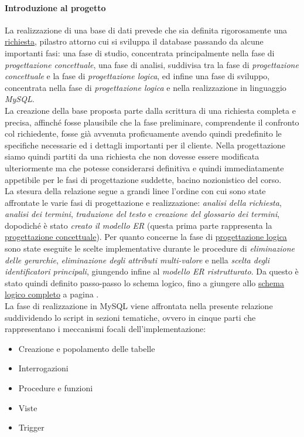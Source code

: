 \documentclass[11pt, openany]{article}
\theoremstyle{definition}
\theoremstyle{plain}
\theoremstyle{remark}
\begin{document}
		\paragraph{Introduzione al progetto}
			La realizzazione di una base di dati prevede che sia definita rigorosamente una \underline{richiesta}, pilastro attorno cui si sviluppa il database passando da alcune importanti fasi: una fase di studio, concentrata principalmente nella fase di \textit{progettazione concettuale}, una fase di analisi, suddivisa tra la fase di \textit{progettazione concettuale} e la fase di \textit{progettazione logica}, ed infine una fase di sviluppo, concentrata nella fase di \textit{progettazione logica} e nella realizzazione in linguaggio \textit{MySQL}.\\
			La creazione della base proposta parte dalla scrittura di una richiesta completa e precisa, affinché fosse plausibile che la fase preliminare, comprendente il confronto col richiedente, fosse già avvenuta proficuamente avendo quindi predefinito le specifiche necessarie ed i dettagli importanti per il cliente. Nella progettazione siamo quindi partiti da una richiesta che non dovesse essere modificata ulteriormente ma che potesse considerarsi definitiva e quindi immediatamente appetibile per le fasi di progettazione suddette, bacino nozionistico del corso.\\
			La stesura della relazione segue a grandi linee l'ordine con cui sono state affrontate le varie fasi di progettazione e realizzazione: \textit{analisi della richiesta}, \textit{analisi dei termini}, \textit{traduzione del testo} e \textit{creazione del glossario dei termini}, dopodiché è stato \textit{creato il modello ER} (questa prima parte rappresenta la \underline{progettazione concettuale}). Per quanto concerne la fase di \underline{progettazione logica} sono state eseguite le scelte implementative durante le procedure di \textit{eliminazione delle gerarchie}, \textit{eliminazione degli attributi multi-valore} e nella \textit{scelta degli identificatori principali}, giungendo infine al \textit{modello ER ristrutturato}. Da questo è stato quindi definito passo-passo lo schema logico, fino a giungere allo \underline{schema logico completo} a pagina \pageref{tab:schema logico}.\\
			La fase di realizzazione in MySQL viene affrontata nella presente relazione suddividendo lo script in sezioni tematiche, ovvero in cinque parti che rappresentano i meccanismi focali dell'implementazione:
			\begin{itemize}
				\item Creazione e popolamento delle tabelle
				\item Interrogazioni
				\item Procedure e funzioni
				\item Viste
				\item Trigger
			\end{itemize}
			
\end{document}
